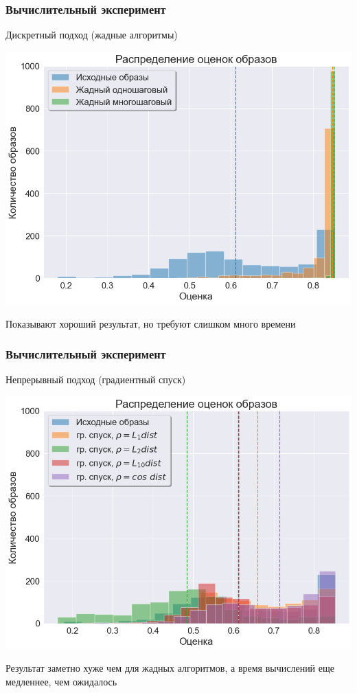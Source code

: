 \documentclass[10pt]{beamer}
\begin{document}
\begin{frame}
	\frametitle{Вычислительный эксперимент}
	\begin{block}{Дискретный подход (жадные алгоритмы)}
		\vspace{-0.3cm}
		\begin{center}
		\includegraphics[scale = 0.47]{../figures/greedy_at_least_5_subset1000.png}
		\end{center}
		
		Показывают хороший результат, но требуют слишком много времени
	\end{block}
\end{frame}

\begin{frame}
	\frametitle{Вычислительный эксперимент}
	\begin{block}{Непрерывный подход (градиентный спуск)}
		\vspace{-0.3cm}
		\begin{center}
			\includegraphics[scale = 0.47]{../figures/backprop_at_least_5_subset1000.png}
		\end{center}
	\end{block}
Результат заметно хуже чем для жадных алгоритмов, а время вычислений еще медленнее, чем ожидалось
\end{frame}
\end{document}
